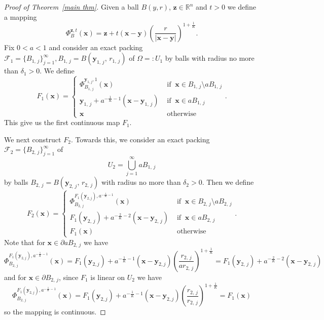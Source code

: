 \documentclass[10pt,a4paper]{amsart}
\begin{document}
\begin{proof}[Proof of Theorem~\ref{main thm}]
Given a ball $B(y,r)$, $\mathbf z\in \mathbb R^n$ and $t>0$ we define a mapping
$$\Phi_{B}^{\mathbf z,t}(\mathbf x)=\mathbf z+ t(\mathbf x-\mathbf y)\left(\frac{r}{|\mathbf x-\mathbf y|}\right)^{1+\frac 1 K}.$$
 Fix $0<a<1$ and consider an exact packing $\mathcal F_1=\{B_{1,\,j}\}_{j=1}^\infty, B_{1,\,j}=B(\mathbf {y}_{1,\,j},\,r_{1,\,j})$ of $\Omega=:U_1$ by balls  with radius no more than $\delta_1>0$. We define 
$$
F_1(\mathbf {x}) = \left\{ \begin{array}{ll}
\Phi^{\mathbf{y}_{1,j},1}_{B_{1,\,j}}(\mathbf {x}) & \textrm{ if } \ \mathbf x\in B_{1,\,j}\setminus a B_{1,\,j}\\
\mathbf {y}_{1,\,j}+a^{-\frac 1 K-1}(\mathbf x-\mathbf {y}_{1,\,j}) & \textrm{ if } \ \mathbf  x\in aB_{1,\,j}\\
\mathbf {x}  & \textrm{ otherwise }
\end{array} \right. .$$
This give us the first continuous map $F_1$.

We next construct $F_2$. Towards this, we consider  an exact packing $\mathcal F_2=\{B_{2,\,j}\}_{j=1}^\infty$ of 
$$U_2=\bigcup_{j=1}^\infty aB_{1,\,j}$$
by balls $B_{2,\,j}=B(\mathbf {y}_{2,\,j},\,r_{2,\,j})$ with radius no more than $\delta_2>0$.
Then we define
$$
F_2(\mathbf {x}) = \left\{ \begin{array}{ll}
\Phi^{F_1(\mathbf y_{2,j}),a^{-\frac{1}{K}-1}}_{B_{2,\,j}}(\mathbf {x}) & \textrm{ if } \ \mathbf x\in B_{2,\,j}\setminus a B_{2,\,j}\\
F_1(\mathbf {y}_{2,\,j})+a^{-\frac 2 K-2}(\mathbf x-\mathbf {y}_{2,\,j}) & \textrm{ if } \  \mathbf x\in aB_{2,\,j}\\
F_1(\mathbf x) & \textrm{ otherwise }
\end{array} \right. .$$
Note that for $\mathbf{x}\in \partial a B_{2,\,j}$ we have
$$
\Phi^{F_1(\mathbf{y}_{2,j}),a^{-\frac{1}{K}-1}}_{B_{2,\,j}}(\mathbf {x})=
F_1(\mathbf{y}_{2,j})+a^{-\frac{1}{K}-1} (\mathbf{x}-\mathbf{y}_{2,j})
\left(\frac{r_{2,\,j}}{ar_{2,\,j}}\right)^{1+\frac 1 K}=F_1(\mathbf {y}_{2,\,j})+a^{-\frac 2 K-2}(\mathbf x-\mathbf {y}_{2,\,j})
$$
and for $\mathbf{x}\in \partial B_{2,\,j}$, since $F_1$ is linear on $U_2$ we have
$$
\Phi^{F_1(\mathbf{y}_{2,j}),a^{-\frac{1}{K}-1}}_{B_{2,\,j}}(\mathbf {x})=
F_1(\mathbf{y}_{2,j})+a^{-\frac{1}{K}-1} (\mathbf{x}-\mathbf{y}_{2,j})
\left(\frac{r_{2,\,j}}{r_{2,\,j}}\right)^{1+\frac 1 K}= F_1(\mathbf{x})
$$
so the mapping is continuous.


\end{proof}
\end{document}
